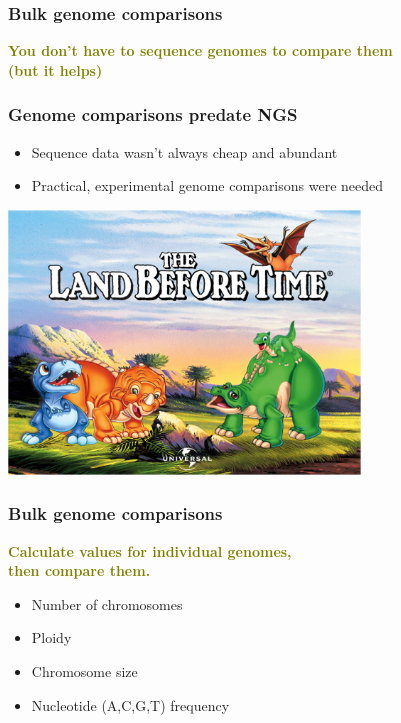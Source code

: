 
%
\begin{frame}
  \frametitle{Bulk genome comparisons}
  \Large{
    \textcolor{olive}{
      \textbf{
      You don't have to sequence genomes to compare them \\
      (but it helps) \\
      }
    }
  }
\end{frame}

%
\begin{frame}
  \frametitle{Genome comparisons predate NGS}
  \begin{itemize}
    \item Sequence data wasn't always cheap and abundant
    \item Practical, experimental genome comparisons were needed
  \end{itemize}
  \begin{center}
    \includegraphics[width=0.7\textwidth]{images/land_before_time}
  \end{center}  
\end{frame}

%
\begin{frame}
  \frametitle{Bulk genome comparisons}
  \Large{
    \textcolor{olive}{
      \textbf{
      Calculate values for individual genomes, \\
      then compare them.
      }
    }
  }
  \normalsize{
        \begin{itemize}
         \item \textcolor{hutton_green}{Number of chromosomes}
         \item \textcolor{hutton_blue}{Ploidy}
         \item \textcolor{RawSienna}{Chromosome size}
         \item \textcolor{hutton_purple}{Nucleotide (A,C,G,T) frequency}        
        \end{itemize}
  }
\end{frame}

